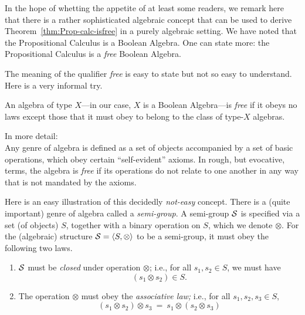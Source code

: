 In the hope of whetting the appetite of at least some readers, we remark here that there is a rather sophisticated algebraic concept that can be used to derive Theorem~\ref{thm:Prop-calc-isfree} in a purely algebraic setting.  We have noted that the Propositional Calculus is a Boolean Algebra.  One can state more: the Propositional Calculus is a {\em free} Boolean Algebra.

\smallskip

The meaning of the qualifier {\it free} is easy to state but not so easy to understand.  Here is a very informal try.

\smallskip

An algebra of type $X$---in our case, $X$ is a Boolean Algebra---is {\em free} if it obeys no laws except those that it must obey to belong to the class of type-$X$ algebras.

\smallskip


In more detail: \\
Any genre of algebra is defined as a set of objects accompanied by a set of basic operations, which obey certain ``self-evident'' axioms.  In rough, but evocative, terms, the algebra is {\em free} if its operations do not relate to one another in any way that is not mandated by the axioms.

\smallskip

 

Here is an easy illustration of this decidedly {\em not-easy} concept.  There is a (quite important) genre of algebra called a {\it semi-group}.  A semi-group $\mbox{$\cal S$}$ is specified via a set (of objects) $S$, together with a binary operation on $S$, which we denote $\otimes$.  For the (algebraic) structure $\mbox{$\cal S$} = \langle S, \otimes \rangle$ to be a semi-group, it must obey the following two laws.
\begin{enumerate}
\item
$\mbox{$\cal S$}$ must be {\it closed} under operation $\otimes$; i.e., for all $s_1, s_2 \in S$, we must have
\[ (s_1 \otimes s_2) \in S. \]
\item
The operation $\otimes$ must obey the {\em associative law;} i.e., for all $s_1, s_2, s_3 \in S$,
\[ (s_1 \otimes s_2) \otimes s_3 \ = \ s_1 \otimes (s_2 \otimes s_3) \]
\end{enumerate}


